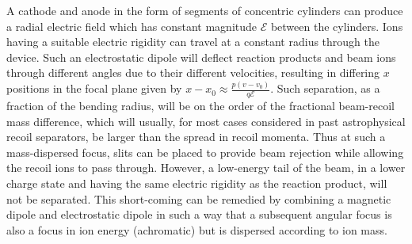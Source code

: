 A cathode and anode in the form of segments of concentric cylinders can produce a radial electric field which has constant magnitude $\mathcal{E}$  between the cylinders.   Ions having a suitable electric rigidity can travel at a constant radius through the device. Such an electrostatic dipole will deflect reaction products and beam ions through different angles due to their different velocities, resulting in differing $x$ positions in the focal plane given by $x-x_0\approx\frac{p(v-v_0)}{q\mathcal{E}}$. Such separation, as a fraction of the bending radius, will be on the order of the fractional beam-recoil mass difference, which will usually, for most cases considered in past astrophysical recoil separators, be larger than the spread in recoil momenta. Thus at such a mass-dispersed focus, slits can be placed to provide beam rejection while allowing the recoil ions to pass through.   However, a low-energy tail of the beam, in a lower charge state and having the same electric rigidity as the reaction product, will not be separated. This short-coming can be remedied by combining a magnetic dipole and electrostatic dipole in such a way that a subsequent angular focus is also a focus in ion energy (achromatic) but is dispersed according to ion mass.  

